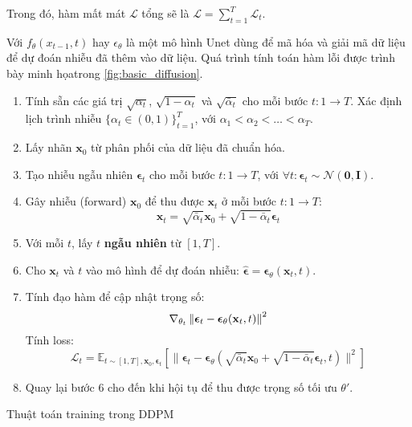 Trong đó, hàm mất mát $\mathcal{L}$ tổng sẽ là  $\mathcal{L} = \sum_{t=1}^{T} \mathcal{L}_t$.

Với $f_{\theta}(x_{t-1}, t)$ hay $\epsilon_\theta$ là một mô hình Unet dùng để mã hóa và giải mã dữ liệu để dự đoán nhiễu đã thêm vào dữ liệu. Quá trình tính toán hàm lỗi được trình bày minh họatrong \autoref{fig:basic_diffusion}.


\begin{algorithm}[H]
	
	\setlength{\baselineskip}{10pt}
	\begin{enumerate}
		\vspace{5pt}
		\item Tính sẵn các giá trị $\sqrt{\alpha_t}$, $\sqrt{1 - \alpha_t}$ và $\sqrt{\bar{\alpha}_t}$ cho mỗi bước $t: 1 \rightarrow T$. Xác định lịch trình nhiễu $\{\alpha_t \in (0, 1)\}_{t=1}^T$, với $\alpha_1 < \alpha_2 < \dots < \alpha_T$.
		
		\item Lấy nhãn $\mathbf{x}_0$ từ phân phối của dữ liệu đã chuẩn hóa.
		
		\item Tạo nhiễu ngẫu nhiên $\boldsymbol{\epsilon}_t$ cho mỗi bước $t: 1 \rightarrow T$, với $\forall t: \boldsymbol{\epsilon}_t \sim \mathcal{N}(\mathbf{0}, \mathbf{I})$.
		
		\item Gây nhiễu (forward) $\mathbf{x}_0$ để thu được $\mathbf{x}_t$ ở mỗi bước $t: 1 \rightarrow T$:
		$$
		\mathbf{x}_t = \sqrt{\bar{\alpha}_t} \mathbf{x}_0 + \sqrt{1 - \bar{\alpha}_t} \boldsymbol{\epsilon}_t
		$$
		
		\item Với mỗi $t$, lấy $t$ \textbf{ngẫu nhiên} từ $[1, T]$.
		
		\item Cho $\mathbf{x}_t$ và $t$ vào mô hình để dự đoán nhiễu: $\hat{\boldsymbol{\epsilon}} = \boldsymbol{\epsilon}_\theta(\mathbf{x}_t, t)$.
		
		\item Tính đạo hàm để cập nhật trọng số:
		$$
		\nabla_{\theta_t} \left\| \boldsymbol{\epsilon}_t - \boldsymbol{\epsilon}_\theta(\mathbf{x}_t, t) \right\|^2
		$$
		Tính loss:
		$$
		\mathcal{L}_t = \mathbb{E}_{t \sim [1, T], \mathbf{x}_0, \boldsymbol{\epsilon}_t} \left[ \|\boldsymbol{\epsilon}_t - \boldsymbol{\epsilon}_\theta(\sqrt{\bar{\alpha}_t} \mathbf{x}_0 + \sqrt{1 - \bar{\alpha}_t} \boldsymbol{\epsilon}_t, t)\|^2 \right]
		$$
		
		\item Quay lại bước 6 cho đến khi hội tụ để thu được trọng số tối ưu $\theta'$.
	\end{enumerate}
	\caption{Thuật toán training trong DDPM}
	\label{alg:TrainingDDPM}
\end{algorithm}


